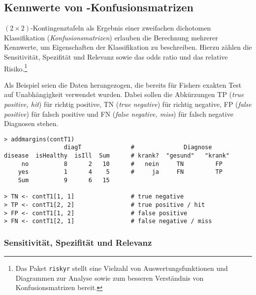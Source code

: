 \subsection[Kennwerte von \texorpdfstring{$(2 \times 2)$}{(2x2)}-Konfusionsmatrizen]{Kennwerte von -Konfusionsmatrizen}
\label{sec:confMat}

$(2 \times 2)$-Kontingenztafeln als Ergebnis einer zweifachen dichotomen Klassifikation (\emph{Konfusionsmatrizen}) erlauben die Berechnung mehrerer Kennwerte, um Eigenschaften der Klassifikation zu beschreiben. Hierzu zählen die Sensitivität, Spezifität und Relevanz sowie das odds ratio und das relative Risiko.\footnote{Das Paket \lstinline!riskyr! \cite{Neth2019} stellt eine Vielzahl von Auswertungsfunktionen und Diagrammen zur Analyse sowie zum besseren Verständnis von Konfusionsmatrizen bereit.}

Als Beispiel seien die Daten herangezogen, die bereits für Fishers exakten Test auf Unabhängigkeit verwendet wurden. Dabei sollen die Abkürzungen TP (\emph{true positive, hit}) für richtig positive, TN (\emph{true negative}) für richtig negative, FP (\emph{false positive}) für falsch positive und FN (\emph{false negative, miss}) für falsch negative Diagnosen stehen.
\begin{lstlisting}
> addmargins(contT1)
                 diagT              #              Diagnose
disease  isHealthy  isIll  Sum      # krank?  "gesund"   "krank"
     no          8      2   10      #   nein     TN         FP
    yes          1      4    5      #     ja     FN         TP
    Sum          9      6   15

> TN <- contT1[1, 1]                # true negative
> TP <- contT1[2, 2]                # true positive / hit
> FP <- contT1[1, 2]                # false positive
> FN <- contT1[2, 1]                # false negative / miss
\end{lstlisting}

\subsubsection{Sensitivität, Spezifität und Relevanz}

